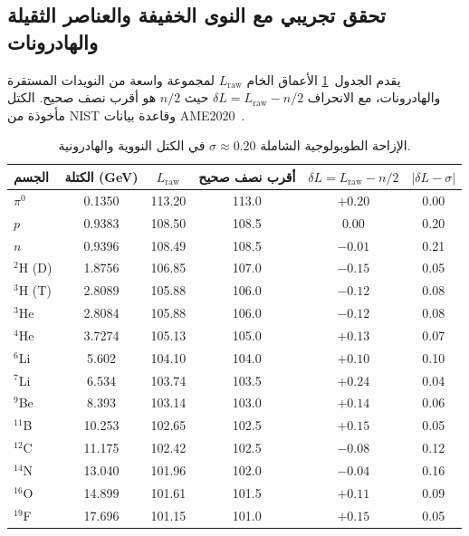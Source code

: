 \documentclass[12pt,a4paper]{article}
\begin{document}
	\subsection{تحقق تجريبي مع النوى الخفيفة والعناصر الثقيلة والهادرونات}
	يقدم الجدول~\ref{tab:nuclear_sigma} الأعماق الخام \(L_{\mathrm{raw}}\) لمجموعة واسعة من النويدات المستقرة والهادرونات، مع الانحراف \(\delta L = L_{\mathrm{raw}} - n/2\) حيث \(n/2\) هو أقرب نصف صحيح. الكتل مأخوذة من NIST وقاعدة بيانات AME2020~\cite{AME2020}.
	
	\begin{otherlanguage}{english}
		\begin{table}[htbp]
			\centering
			\caption{الإزاحة الطوبولوجية الشاملة \(\sigma \approx 0.20\) في الكتل النووية والهادرونية.}
			\label{tab:nuclear_sigma}
			\small
			\begin{tabular}{l c c c c c}
				\toprule
				الجسم & الكتلة (GeV) & \(L_{\mathrm{raw}}\) & أقرب نصف صحيح & \(\delta L = L_{\mathrm{raw}} - n/2\) & \(|\delta L - \sigma|\) \\
				\midrule
				\(\pi^0\) & 0.1350 & 113.20 & 113.0 & \(+0.20\) & 0.00 \\
				\(p\)     & 0.9383 & 108.50 & 108.5 & \(0.00\)  & 0.20 \\
				\(n\)     & 0.9396 & 108.49 & 108.5 & \(-0.01\) & 0.21 \\
				\(^2\)H (D) & 1.8756 & 106.85 & 107.0 & \(-0.15\) & 0.05 \\
				\(^3\)H (T) & 2.8089 & 105.88 & 106.0 & \(-0.12\) & 0.08 \\
				\(^3\)He & 2.8084 & 105.88 & 106.0 & \(-0.12\) & 0.08 \\
				\(^4\)He & 3.7274 & 105.13 & 105.0 & \(+0.13\) & 0.07 \\
				\(^6\)Li & 5.602  & 104.10 & 104.0 & \(+0.10\) & 0.10 \\
				\(^7\)Li & 6.534  & 103.74 & 103.5 & \(+0.24\) & 0.04 \\
				\(^9\)Be & 8.393  & 103.14 & 103.0 & \(+0.14\) & 0.06 \\
				\(^{11}\)B & 10.253 & 102.65 & 102.5 & \(+0.15\) & 0.05 \\
				\(^{12}\)C & 11.175 & 102.42 & 102.5 & \(-0.08\) & 0.12 \\
				\(^{14}\)N & 13.040 & 101.96 & 102.0 & \(-0.04\) & 0.16 \\
				\(^{16}\)O & 14.899 & 101.61 & 101.5 & \(+0.11\) & 0.09 \\
				\(^{19}\)F & 17.696 & 101.15 & 101.0 & \(+0.15\) & 0.05 \\

\end{tabular}
\end{table}
\end{otherlanguage}
\end{document}
